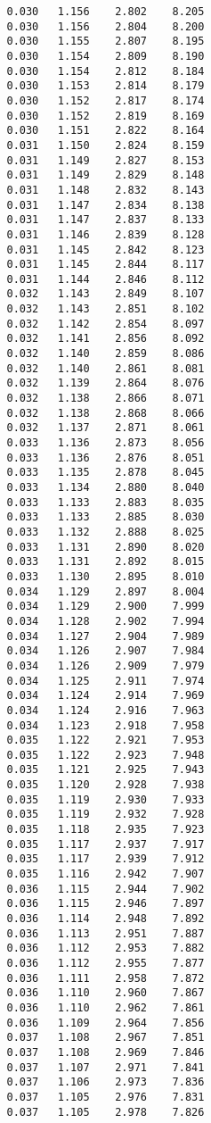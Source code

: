 \begin{verbatim}
   0.030   1.156    2.802    8.205
   0.030   1.156    2.804    8.200
   0.030   1.155    2.807    8.195
   0.030   1.154    2.809    8.190
   0.030   1.154    2.812    8.184
   0.030   1.153    2.814    8.179
   0.030   1.152    2.817    8.174
   0.030   1.152    2.819    8.169
   0.030   1.151    2.822    8.164
   0.031   1.150    2.824    8.159
   0.031   1.149    2.827    8.153
   0.031   1.149    2.829    8.148
   0.031   1.148    2.832    8.143
   0.031   1.147    2.834    8.138
   0.031   1.147    2.837    8.133
   0.031   1.146    2.839    8.128
   0.031   1.145    2.842    8.123
   0.031   1.145    2.844    8.117
   0.031   1.144    2.846    8.112
   0.032   1.143    2.849    8.107
   0.032   1.143    2.851    8.102
   0.032   1.142    2.854    8.097
   0.032   1.141    2.856    8.092
   0.032   1.140    2.859    8.086
   0.032   1.140    2.861    8.081
   0.032   1.139    2.864    8.076
   0.032   1.138    2.866    8.071
   0.032   1.138    2.868    8.066
   0.032   1.137    2.871    8.061
   0.033   1.136    2.873    8.056
   0.033   1.136    2.876    8.051
   0.033   1.135    2.878    8.045
   0.033   1.134    2.880    8.040
   0.033   1.133    2.883    8.035
   0.033   1.133    2.885    8.030
   0.033   1.132    2.888    8.025
   0.033   1.131    2.890    8.020
   0.033   1.131    2.892    8.015
   0.033   1.130    2.895    8.010
   0.034   1.129    2.897    8.004
   0.034   1.129    2.900    7.999
   0.034   1.128    2.902    7.994
   0.034   1.127    2.904    7.989
   0.034   1.126    2.907    7.984
   0.034   1.126    2.909    7.979
   0.034   1.125    2.911    7.974
   0.034   1.124    2.914    7.969
   0.034   1.124    2.916    7.963
   0.034   1.123    2.918    7.958
   0.035   1.122    2.921    7.953
   0.035   1.122    2.923    7.948
   0.035   1.121    2.925    7.943
   0.035   1.120    2.928    7.938
   0.035   1.119    2.930    7.933
   0.035   1.119    2.932    7.928
   0.035   1.118    2.935    7.923
   0.035   1.117    2.937    7.917
   0.035   1.117    2.939    7.912
   0.035   1.116    2.942    7.907
   0.036   1.115    2.944    7.902
   0.036   1.115    2.946    7.897
   0.036   1.114    2.948    7.892
   0.036   1.113    2.951    7.887
   0.036   1.112    2.953    7.882
   0.036   1.112    2.955    7.877
   0.036   1.111    2.958    7.872
   0.036   1.110    2.960    7.867
   0.036   1.110    2.962    7.861
   0.036   1.109    2.964    7.856
   0.037   1.108    2.967    7.851
   0.037   1.108    2.969    7.846
   0.037   1.107    2.971    7.841
   0.037   1.106    2.973    7.836
   0.037   1.105    2.976    7.831
   0.037   1.105    2.978    7.826

\end{verbatim}
